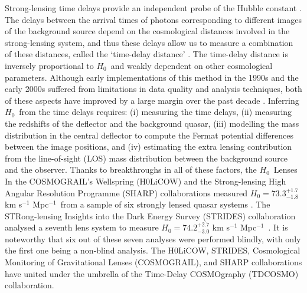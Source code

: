 \documentclass[longauth]{aa}
\newcommand{\ho}{$H_0$}
\newcommand{\hunit}{km s$^{-1}$ Mpc$^{-1}$}
\newcommand{\ajs}[1]{{{#1}}}
\begin{document}
Strong-lensing time delays provide an independent probe of the Hubble constant \citep{Refsdal64}. The \ajs{delays} between the arrival times of photons corresponding to different images of the background source depend on the cosmological distances involved in the strong-lensing system, and thus these delays allow us to measure a combination of these distances, called the `time-delay distance' \citep{Suyu10}.  The time-delay distance is inversely proportional to \ho\ and weakly dependent on other cosmological parameters. Although early implementations of this method in the 1990s and the early 2000s suffered from limitations in data quality and analysis techniques, both of these aspects have improved by a large margin over the past decade \citep[for a review with a historical perspective, see][]{Treu16b}. Inferring \ho\ from the time delays \ajs{requires}: (i) measuring the time delays, \ajs{(ii) measuring the redshifts of the deflector and the background quasar,} (iii) modelling the mass distribution in the central deflector to compute the Fermat potential differences between the image positions, and (iv) estimating the extra lensing contribution from the line-of-sight (LOS) mass distribution between the background source and the observer. Thanks to breakthroughs in all of these factors, the \ho\ Lenses In the COSMOGRAIL's Wellspring (H0LiCOW) and the Strong-lensing   High Angular Resolution Programme (SHARP) collaborations measured $H_0 = 73.3_{-1.8}^{+1.7}$ \hunit\ from a sample of six strongly lensed quasar systems \citep{Suyu17, Bonvin17, Birrer19b, Chen19, Rusu20, Wong20}. The STRong-lensing Insights into the Dark Energy Survey (STRIDES) collaboration analysed a seventh lens system to measure $H_0 = 74.2_{-3.0}^{+2.7}$ \hunit\ \citep{Shajib20}. It is noteworthy that six out of these seven analyses were performed blindly, with only the first one being a non-blind analysis. The H0LiCOW, STRIDES, Cosmological Monitoring of Gravitational Lenses (COSMOGRAIL), and SHARP collaborations have united under the umbrella of the Time-Delay COSMOgraphy (TDCOSMO) collaboration.
\end{document}
